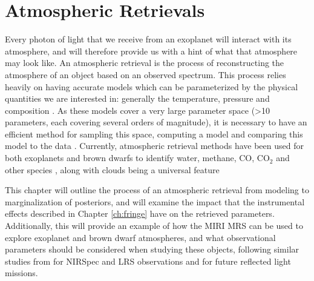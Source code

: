 \chapter{Atmospheric Retrievals}
Every photon of light that we receive from an exoplanet will interact with its atmosphere, and will therefore provide us with a hint of what that atmosphere may look like.
An atmospheric retrieval is the process of reconstructing the atmosphere of an object based on an observed spectrum.
This process relies heavily on having accurate models which can be parameterized by the physical quantities we are interested in: generally the temperature, pressure and composition \parencite{Madhusudhan2018}.
As these models cover a very large parameter space (>10 parameters, each covering several orders of magnitude), it is necessary to have an efficient method for sampling this space, computing a model and comparing this model to the data 
\parencite{Benneke2012,Benneke2013}.
Currently, atmospheric retrieval methods have been used for both exoplanets and brown dwarfs to identify water, methane, CO, CO$_{2}$ and other species \parencite{Konopacky2013,Barman2015}, along with clouds being a universal feature \parencite{Line2017,Schlawin2018,Morley2018}

This chapter will outline the process of an atmospheric retrieval from modeling to marginalization of posteriors, and will examine the impact that the instrumental effects described in Chapter \ref{ch:fringe} have on the retrieved parameters. 
Additionally, this will provide an example of how the MIRI MRS can be used to explore exoplanet and brown dwarf atmospheres, and what observational parameters should be considered when studying these objects, following similar studies from \parencite{Batalha2018,Schlawin2018} for NIRSpec and LRS observations and \parencite{Feng2018} for future reflected light missions.






